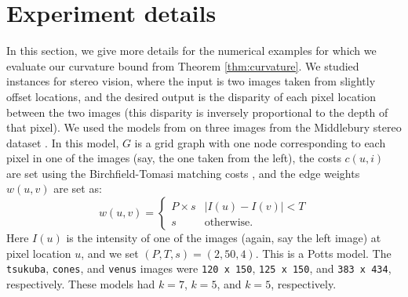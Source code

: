 \section{Experiment details}\label{sec:experiments_details}
In this section, we give more details for the numerical examples for which we evaluate our curvature bound from Theorem \ref{thm:curvature}. We studied instances for stereo vision, where the input is two images taken from slightly offset locations, and the desired output is the disparity of each pixel location between the two images (this disparity is inversely proportional to the depth of that pixel). We used the models from \citet{tappen2003comparison} on three images from the Middlebury stereo dataset \citep{scharstein2002taxonomy}. In this model, $G$ is a grid graph with one node corresponding to each pixel in one of the images (say, the one taken from the left), the costs $c(u,i)$ are set using the Birchfield-Tomasi matching costs \citep{birchfield1998pixel}, and the edge weights $w(u,v)$ are set as:
\[
w(u,v) = \begin{cases}
P \times s & |I(u) - I(v)| < T\\
s & \text{otherwise}.
\end{cases}
\]
Here $I(u)$ is the intensity of one of the images (again, say the left image) at pixel location $u$, and we set $(P,T,s) = (2,50,4)$. This is a Potts model. The {\tt tsukuba}, {\tt cones}, and {\tt venus} images were {\tt 120 x 150}, {\tt 125 x 150}, and {\tt 383 x 434}, respectively. These models had $k=7$, $k=5$, and $k=5$, respectively.

